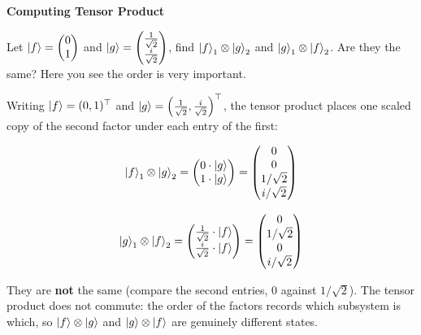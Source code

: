 \documentclass[a4paper, 10pt]{article}
\begin{document}
\begin{problem}
\textbf{Computing Tensor Product}
\par Let \( \displaystyle \ket{f} = \begin{pmatrix}
	0 \\ 1
\end{pmatrix}\) and \( \displaystyle \ket{g} = \begin{pmatrix}
	\frac{1}{\sqrt{2}} \\ \frac{i}{\sqrt{2}}
\end{pmatrix}\), find \( \ket{f}_1 \otimes \ket{g}_2 \) and \( \ket{g}_1 \otimes \ket{f}_2 \).
Are they the same? Here you see the order is very important.
\end{problem}

\begin{solution}
	\noindent Writing \( \ket{f} = (0, 1)^{\top} \) and \( \ket{g} = \left(\tfrac{1}{\sqrt{2}}, \tfrac{i}{\sqrt{2}}\right)^{\top} \), the tensor product places one scaled copy of the second factor under each entry of the first:

	\noindent
	\begin{minipage}[t]{0.46\textwidth}
		\[
			\ket{f}_1 \otimes \ket{g}_2
			= \begin{pmatrix} 0 \cdot \ket{g} \\ 1 \cdot \ket{g} \end{pmatrix}
			= \begin{pmatrix} 0 \\ 0 \\ 1/\sqrt{2} \\ i/\sqrt{2} \end{pmatrix}
		\]
	\end{minipage}%
	\hfill \vrule \hfill
	\begin{minipage}[t]{0.46\textwidth}
		\[
			\ket{g}_1 \otimes \ket{f}_2
			= \begin{pmatrix} \tfrac{1}{\sqrt{2}} \cdot \ket{f} \\ \tfrac{i}{\sqrt{2}} \cdot \ket{f} \end{pmatrix}
			= \begin{pmatrix} 0 \\ 1/\sqrt{2} \\ 0 \\ i/\sqrt{2} \end{pmatrix}
		\]
	\end{minipage}

	\myspace

	\noindent They are \textbf{not} the same (compare the second entries, \( 0 \) against \( 1/\sqrt{2} \)).
	The tensor product does not commute: the order of the factors records which subsystem is which, so \( \ket{f}\otimes\ket{g} \) and \( \ket{g}\otimes\ket{f} \) are genuinely different states.
\end{solution}
\end{document}
